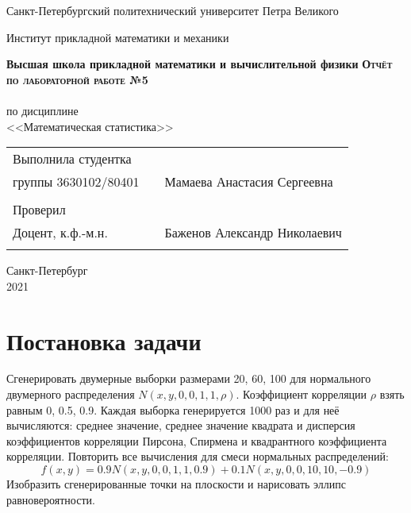 \documentclass{article}
\begin{document}
\begin{titlepage}
  \begin{center}
    \large
    Санкт-Петербургский политехнический университет Петра Великого
    
    Институт прикладной математики и механики
    
    \textbf{Высшая школа прикладной математики и вычислительной физики}
    \vfill
    \textsc{\textbf{\Large{Отчёт по лабораторной работе №5}}}\\[5mm]
    \\ по дисциплине
    \\ <<Математическая статистика>>\\
\end{center}

\vfill

\begin{tabular}{l p{} l}
Выполнила студентка \\группы 3630102/80401 && Мамаева Анастасия Сергеевна \\
\\
Проверил\\Доцент, к.ф.-м.н.& \hspace{0pt} &   Баженов Александр Николаевич \\\\
\end{tabular}

\hfill \break
\hfill \break
\begin{center} Санкт-Петербург \\2021 \end{center}
\thispagestyle{empty}
\end{titlepage}
\newpage
\newpage
\begin{center}
    \setcounter{page}{2}
    \tableofcontents
\end{center}
\newpage
\begin{center}
    \setcounter{page}{3}
    \listoffigures
\end{center}

\newpage

\section {Постановка задачи}
\noindent Сгенерировать двумерные выборки размерами 20, 60, 100 для нормального двумерного распределения $N(x,y,0,0,1,1,\rho)$. Коэффициент корреляции $\rho$ взять равным 0, 0.5, 0.9. Каждая выборка генерируется 1000 раз и для неё вычисляются: среднее значение, среднее значение квадрата и дисперсия коэффициентов корреляции Пирсона, Спирмена и квадрантного коэффициента корреляции. Повторить все вычисления для смеси нормальных распределений:
\begin{equation}
	f(x,y) = 0.9N(x,y,0,0,1,1,0.9) + 0.1N(x,y,0,0,10,10,-0.9)
\end{equation}
\noindent Изобразить сгенерированные точки на плоскости и нарисовать эллипс равновероятности.
\end{document}

